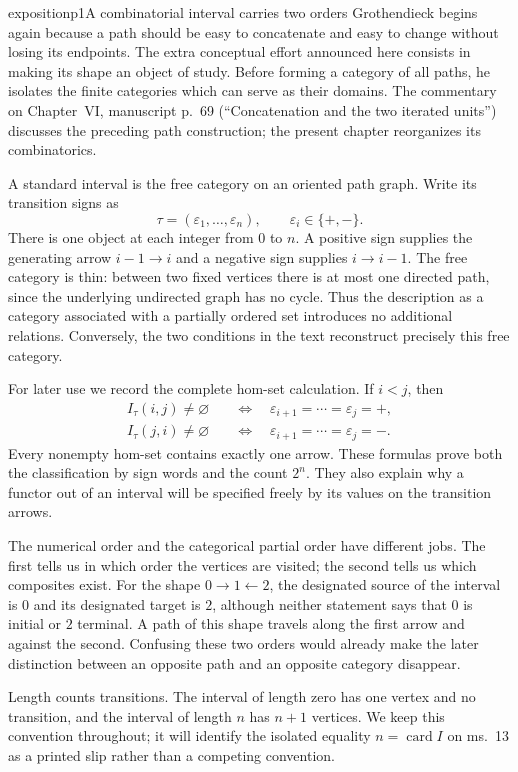 
\begin{dcomment}{exposition}{p1}{A combinatorial interval carries two orders}
Grothendieck begins again because a path should be easy to concatenate and easy to change without losing its endpoints. The extra conceptual effort announced here consists in making its shape an object of study. Before forming a category of all paths, he isolates the finite categories which can serve as their domains. The commentary on Chapter~VI, manuscript p.~69 (``Concatenation and the two iterated units'') discusses the preceding path construction; the present chapter reorganizes its combinatorics.

A standard interval is the free category on an oriented path graph. Write its transition signs as
\[
 \tau=(\varepsilon _1,\ldots,\varepsilon _n),\qquad
 \varepsilon_i\in\{+,-\}.
\]
There is one object at each integer from $0$ to $n$. A positive sign supplies the generating arrow $i-1\to i$ and a negative sign supplies $i\to i-1$. The free category is thin: between two fixed vertices there is at most one directed path, since the underlying undirected graph has no cycle. Thus the description as a category associated with a partially ordered set introduces no additional relations. Conversely, the two conditions in the text reconstruct precisely this free category.

For later use we record the complete hom-set calculation. If $i<j$, then
\[
\begin{split}
 I_\tau(i,j)\ne\varnothing
   &\quad\Longleftrightarrow\quad
   \varepsilon_{i+1}=\cdots=\varepsilon_j=+,\\
 I_\tau(j,i)\ne\varnothing
   &\quad\Longleftrightarrow\quad
   \varepsilon_{i+1}=\cdots=\varepsilon_j=-.
\end{split}
\]
Every nonempty hom-set contains exactly one arrow. These formulas prove both the classification by sign words and the count $2^n$. They also explain why a functor out of an interval will be specified freely by its values on the transition arrows.

The numerical order and the categorical partial order have different jobs. The first tells us in which order the vertices are visited; the second tells us which composites exist. For the shape $0\to1\leftarrow2$, the designated source of the interval is $0$ and its designated target is $2$, although neither statement says that $0$ is initial or $2$ terminal. A path of this shape travels along the first arrow and against the second. Confusing these two orders would already make the later distinction between an opposite path and an opposite category disappear.

Length counts transitions. The interval of length zero has one vertex and no transition, and the interval of length $n$ has $n+1$ vertices. We keep this convention throughout; it will identify the isolated equality $n=\operatorname{card}I$ on ms.~13 as a printed slip rather than a competing convention.
\end{dcomment}

